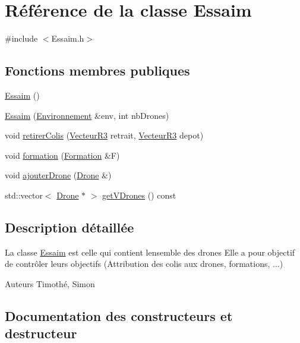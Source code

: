 \hypertarget{class_essaim}{}\section{Référence de la classe Essaim}
\label{class_essaim}


{\ttfamily \#include $<$Essaim.\+h$>$}

\subsection*{Fonctions membres publiques}
\begin{DoxyCompactItemize}
\item 
\mbox{\hyperlink{class_essaim_a054ed8782a5d32914b820e635a0a1fdc}{Essaim}} ()
\item 
\mbox{\hyperlink{class_essaim_a1b2112a27d547ae2e19d75166b396886}{Essaim}} (\mbox{\hyperlink{class_environnement}{Environnement}} \&env, int nb\+Drones)
\item 
void \mbox{\hyperlink{class_essaim_a6e5a1427a3bdd7b7c7a29f07b54a5ae7}{retirer\+Colis}} (\mbox{\hyperlink{class_vecteur_r3}{Vecteur\+R3}} retrait, \mbox{\hyperlink{class_vecteur_r3}{Vecteur\+R3}} depot)
\item 
void \mbox{\hyperlink{class_essaim_acca17cbaea8479e9a6e1809e09bf913a}{formation}} (\mbox{\hyperlink{class_formation}{Formation}} \&F)
\item 
void \mbox{\hyperlink{class_essaim_a267e5067cbc6f33f3fa2b7e4e4a742a9}{ajouter\+Drone}} (\mbox{\hyperlink{class_drone}{Drone}} \&)
\item 
std\+::vector$<$ \mbox{\hyperlink{class_drone}{Drone}} $\ast$ $>$ \mbox{\hyperlink{class_essaim_a3910964b67c78a6897a723f9ed2972aa}{get\+V\+Drones}} () const
\end{DoxyCompactItemize}


\subsection{Description détaillée}
La classe \mbox{\hyperlink{class_essaim}{Essaim}} est celle qui contient l\textquotesingle{}ensemble des drones Elle a pour objectif de contrôler leurs objectifs (Attribution des colis aux drones, formations, ...)

\begin{DoxyAuthor}{Auteurs}
Timothé, Simon 
\end{DoxyAuthor}


\subsection{Documentation des constructeurs et destructeur}
\mbox{\label{class_essaim_a054ed8782a5d32914b820e635a0a1fdc}} 
